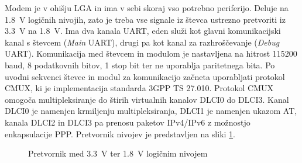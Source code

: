 \documentclass[a4paper,twoside,openright,12pt,slovene]{book}
\begin{document}
Modem je v ohišju LGA in ima v sebi skoraj vso potrebno periferijo. Deluje na \SI{1,8}{\volt} logičnih nivojih, zato je treba vse signale iz števca ustrezno pretvoriti iz \SI{3,3}{\volt} na \SI{1,8}{\volt}. Ima dva kanala UART, eden služi kot glavni komunikacijski kanal s števcem (\textit{Main} UART), drugi pa kot kanal za razhroščevanje (\textit{Debug} UART). Komunikacija med števcem in modulom je nastavljena na hitrost 115200 baud, 8 podatkovnih bitov, 1 stop bit ter ne uporablja paritetnega bita. Po uvodni sekvenci števec in modul za komunikacijo začneta uporabljati protokol CMUX, ki je implementacija standarda 3GPP TS 27.010. Protokol CMUX omogoča multipleksiranje do štirih virtualnih kanalov DLCI0 do DLCI3. Kanal DLCI0 je namenjen krmiljenju multipleksiranja, DLCI1 je namenjen ukazom AT, kanala DLCI2 in DLCI3 pa prenosu paketov IPv4/IPv6 z možnostjo enkapsulacije PPP. Pretvornik nivojev je predstavljen na sliki \ref{fig:napetostni pretvornik}.

\begin{figure}[h]
    \centering
    
    \caption{Pretvornik med \SI{3,3}{\volt} ter \SI{1,8}{\volt} logičnim nivojem}
    \label{fig:napetostni pretvornik}
\end{figure}
\end{document}
